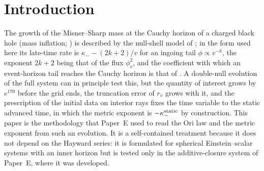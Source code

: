 \documentclass[11pt]{article}
\begin{document}
\begin{abstract}
beyond $v=250$, the ray integration reaches the Ori tail law in $M$ at $v\gtrsim10^3$: $(\kappa_--d\ln M/dv)(v+1)=5.02$ for $k=3/2$ against $2k+2=5$ at $v=2500$, and $3.01$ against $3$ for $k=1/2$ at $B=0.003$. In the window reached by the PDE ($v\lesssim110$) the rate is not the tail law; for steep tails it is close to $\kappa_-(\mu_f)-2\kappa_+$ at $v\approx60$. We state what the method does not show: the closure is additive, the amplitude of $M$ is that of the discrete solution, the flux beyond $v\approx250$ at $B=0.03$ is a linear-response model, and nothing here addresses extendibility.
\end{abstract}

\section{Introduction}
\label{sec:intro}

The growth of the Misner--Sharp mass at the Cauchy horizon of a charged black hole (mass inflation; \citealt{PoissonIsrael1990,Ori1991}) is described by the null-shell model of \citet{Ori1991}; in the form used here its late-time rate is $\kappa_--(2k+2)/v$ for an ingoing tail $\phi\propto v^{-k}$, the exponent $2k+2$ being that of the flux $\phi_v^2$, and the coefficient with which an event-horizon tail reaches the Cauchy horizon is that of \citet{Ori1998}. A double-null evolution of the full system can in principle test this, but the quantity of interest grows by $e^{170}$ before the grid ends, the truncation error of $r_v$ grows with it, and the prescription of the initial data on interior rays fixes the time variable to the static advanced time, in which the metric exponent is $-\kappa_-^{\rm static}$ by construction. This paper is the methodology that Paper~E \citep{PaperE} used to read the Ori law and the metric exponent from such an evolution. It is a self-contained treatment because it does not depend on the Hayward series: it is formulated for spherical Einstein--scalar systems with an inner horizon but is tested only in the additive-closure system of Paper~E, where it was developed.
\end{document}

